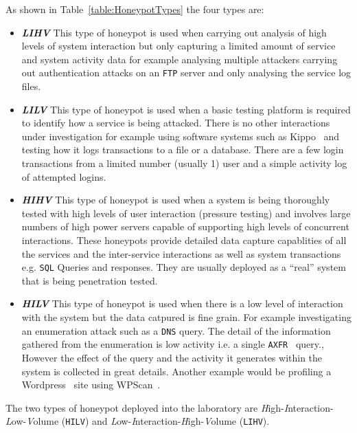 As shown in Table~\ref{table:HoneypotTypes} the four types are:
\begin{itemize}
\item \noindent \emph{\textbf{LIHV}} This type of honeypot is used when carrying out analysis of high levels of system interaction but only capturing a limited amount of service and system activity data for example analysing multiple attackers carrying out authentication attacks on an \texttt{FTP} server and only analysing the service log files. 

\item \noindent \emph{\textbf{LILV}} This type of honeypot is used when a basic testing platform is required to identify how a service is being attacked. There is no other interactions under investigation for example using software systems such as Kippo~\cite{D:16,SH:15} and testing how it logs transactions to a file or a database. There are a few login transactions from a limited number (usually 1) user and a simple activity log of attempted logins.

\item \noindent \emph{\textbf{HIHV}} This type of honeypot is used when a system is being thoroughly tested with high levels of user interaction (pressure testing) and involves large numbers of high power servers capable of supporting high levels of concurrent interactions. These honeypots provide detailed data capture capablities of all the services and the inter-service interactions as well as system transactions e.g. \texttt{SQL} Queries and responses. They are usually deployed  as a ``real'' system that is being penetration tested.  

\item \noindent \emph{\textbf{HILV}} This type of honeypot is used when there is a low level of interaction with the system but the data catpured is fine grain. For example investigating an enumeration attack such as a \texttt{DNS} query. The detail of the information gathered from the enumeration is low activity i.e. a single \texttt{AXFR}~\cite{EL:10} query., However the effect of the query and the activity it generates within the system is collected in great details. Another example would be profiling a Wordpress~\cite{WP:17} site using WPScan~\cite{WT:17}.

\end{itemize}

The two types of honeypot deployed into the laboratory are \emph{H}igh-\emph{I}nteraction-\emph{L}ow-\emph{V}olume (\texttt{HILV}) and \emph{L}ow-\emph{I}nteraction-\emph{H}igh-\emph{V}olume (\texttt{LIHV}).

